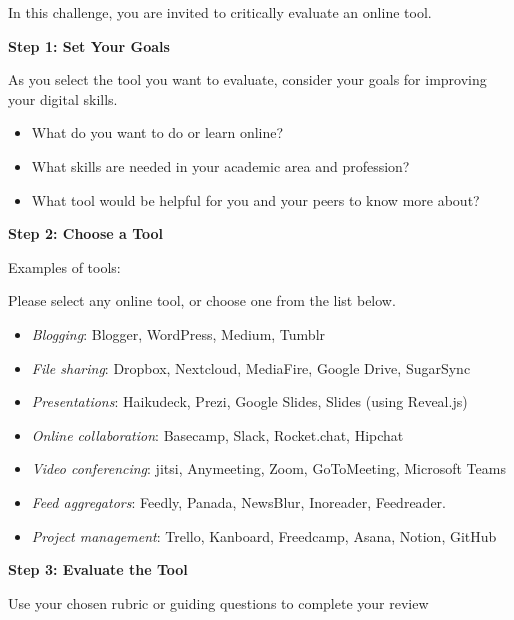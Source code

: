 \documentclass[
]{book}
\providecommand{\tightlist}{%
  \setlength{\itemsep}{0pt}\setlength{\parskip}{0pt}}
\theoremstyle{definition}
\theoremstyle{definition}
\theoremstyle{definition}
\theoremstyle{definition}
\theoremstyle{remark}
\begin{document}
\begin{reflect}
In this challenge, you are invited to critically evaluate an online tool.

\textbf{Step 1: Set Your Goals}

As you select the tool you want to evaluate, consider your goals for improving your digital skills.

\begin{itemize}
\tightlist
\item
  What do you want to do or learn online?\\
\item
  What skills are needed in your academic area and profession?\\
\item
  What tool would be helpful for you and your peers to know more about?
\end{itemize}

\textbf{Step 2: Choose a Tool}

Examples of tools:

Please select any online tool, or choose one from the list below.

\begin{itemize}
\tightlist
\item
  \emph{Blogging}: Blogger, WordPress, Medium, Tumblr\\
\item
  \emph{File sharing}: Dropbox, Nextcloud, MediaFire, Google Drive, SugarSync\\
\item
  \emph{Presentations}: Haikudeck, Prezi, Google Slides, Slides (using Reveal.js)\\
\item
  \emph{Online collaboration}: Basecamp, Slack, Rocket.chat, Hipchat\\
\item
  \emph{Video conferencing}: jitsi, Anymeeting, Zoom, GoToMeeting, Microsoft Teams\\
\item
  \emph{Feed aggregators}: Feedly, Panada, NewsBlur, Inoreader, Feedreader.\\
\item
  \emph{Project management}: Trello, Kanboard, Freedcamp, Asana, Notion, GitHub
\end{itemize}

\textbf{Step 3: Evaluate the Tool}

Use your chosen rubric or guiding questions to complete your review


\end{reflect}
\end{document}
